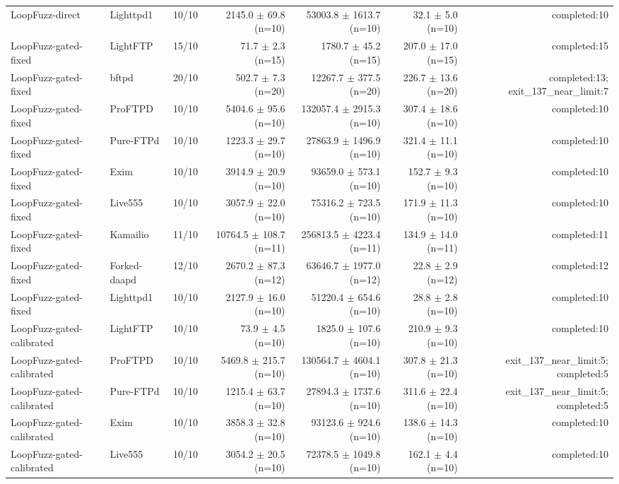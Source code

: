\begin{table}[t]
{\begin{tabular}{llrrrrr}
LoopFuzz-direct & Lighttpd1 & 10/10 & 2145.0 $\pm$ 69.8 (n=10) & 53003.8 $\pm$ 1613.7 (n=10) & 32.1 $\pm$ 5.0 (n=10) & completed:10 \\
LoopFuzz-gated-fixed & LightFTP & 15/10 & 71.7 $\pm$ 2.3 (n=15) & 1780.7 $\pm$ 45.2 (n=15) & 207.0 $\pm$ 17.0 (n=15) & completed:15 \\
LoopFuzz-gated-fixed & bftpd & 20/10 & 502.7 $\pm$ 7.3 (n=20) & 12267.7 $\pm$ 377.5 (n=20) & 226.7 $\pm$ 13.6 (n=20) & completed:13; exit\_137\_near\_limit:7 \\
LoopFuzz-gated-fixed & ProFTPD & 10/10 & 5404.6 $\pm$ 95.6 (n=10) & 132057.4 $\pm$ 2915.3 (n=10) & 307.4 $\pm$ 18.6 (n=10) & completed:10 \\
LoopFuzz-gated-fixed & Pure-FTPd & 10/10 & 1223.3 $\pm$ 29.7 (n=10) & 27863.9 $\pm$ 1496.9 (n=10) & 321.4 $\pm$ 11.1 (n=10) & completed:10 \\
LoopFuzz-gated-fixed & Exim & 10/10 & 3914.9 $\pm$ 20.9 (n=10) & 93659.0 $\pm$ 573.1 (n=10) & 152.7 $\pm$ 9.3 (n=10) & completed:10 \\
LoopFuzz-gated-fixed & Live555 & 10/10 & 3057.9 $\pm$ 22.0 (n=10) & 75316.2 $\pm$ 723.5 (n=10) & 171.9 $\pm$ 11.3 (n=10) & completed:10 \\
LoopFuzz-gated-fixed & Kamailio & 11/10 & 10764.5 $\pm$ 108.7 (n=11) & 256813.5 $\pm$ 4223.4 (n=11) & 134.9 $\pm$ 14.0 (n=11) & completed:11 \\
LoopFuzz-gated-fixed & Forked-daapd & 12/10 & 2670.2 $\pm$ 87.3 (n=12) & 63646.7 $\pm$ 1977.0 (n=12) & 22.8 $\pm$ 2.9 (n=12) & completed:12 \\
LoopFuzz-gated-fixed & Lighttpd1 & 10/10 & 2127.9 $\pm$ 16.0 (n=10) & 51220.4 $\pm$ 654.6 (n=10) & 28.8 $\pm$ 2.8 (n=10) & completed:10 \\
LoopFuzz-gated-calibrated & LightFTP & 10/10 & 73.9 $\pm$ 4.5 (n=10) & 1825.0 $\pm$ 107.6 (n=10) & 210.9 $\pm$ 9.3 (n=10) & completed:10 \\
LoopFuzz-gated-calibrated & ProFTPD & 10/10 & 5469.8 $\pm$ 215.7 (n=10) & 130564.7 $\pm$ 4604.1 (n=10) & 307.8 $\pm$ 21.3 (n=10) & exit\_137\_near\_limit:5; completed:5 \\
LoopFuzz-gated-calibrated & Pure-FTPd & 10/10 & 1215.4 $\pm$ 63.7 (n=10) & 27894.3 $\pm$ 1737.6 (n=10) & 311.6 $\pm$ 22.4 (n=10) & exit\_137\_near\_limit:5; completed:5 \\
LoopFuzz-gated-calibrated & Exim & 10/10 & 3858.3 $\pm$ 32.8 (n=10) & 93123.6 $\pm$ 924.6 (n=10) & 138.6 $\pm$ 14.3 (n=10) & completed:10 \\
LoopFuzz-gated-calibrated & Live555 & 10/10 & 3054.2 $\pm$ 20.5 (n=10) & 72378.5 $\pm$ 1049.8 (n=10) & 162.1 $\pm$ 4.4 (n=10) & completed:10 \\

\end{tabular}}
\end{table}
